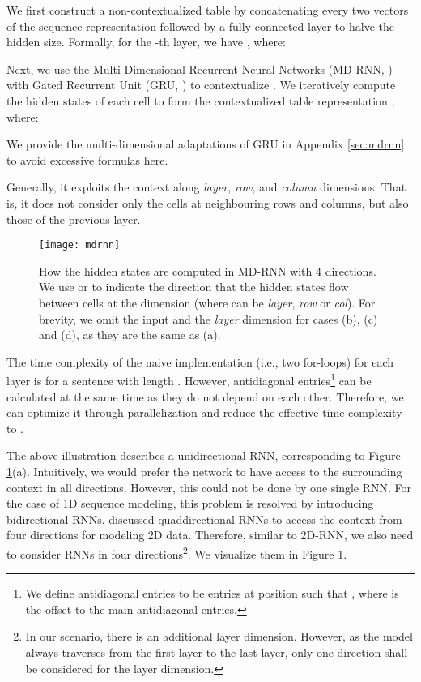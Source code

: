 \documentclass[11pt,a4paper]{article}
\begin{document}
We first construct a non-contextualized table  by concatenating every two vectors of the sequence representation followed by a fully-connected layer to halve the hidden size.
Formally, for the -th layer, we have , where:


Next, we use the Multi-Dimensional Recurrent Neural Networks (MD-RNN, \citealt{graves2007multi}) with Gated Recurrent Unit (GRU, \citealt{gru}) to contextualize .
We iteratively compute the hidden states of each cell to form the contextualized table representation , where:

We provide the multi-dimensional adaptations of GRU in Appendix \ref{sec:mdrnn} to avoid excessive formulas here.

Generally, it exploits the context along \emph{layer}, \emph{row}, and \emph{column} dimensions.
That is, it does not consider only the cells at neighbouring rows and columns,
but also those of the previous layer.

\begin{figure}
    \centering
    \texttt{[image: mdrnn]}
    \caption{How the hidden states are computed in MD-RNN with 4 directions.
    We use  or  to indicate the direction that the hidden states flow between cells at the  dimension (where  can be \emph{layer}, \emph{row} or \emph{col}).
    For brevity, we omit the input and the \emph{layer} dimension for cases (b), (c) and (d), as they are the same as (a).}
    \label{fig:mdrnn}
\end{figure}

{The time complexity of the naive implementation (i.e., two for-loops) for each layer is  for a sentence with length .
However, antidiagonal entries\footnote{
We define antidiagonal entries to be entries at position  such that ,
where  is the offset to the main antidiagonal entries.
} can be calculated at the same time as they do not depend on each other.
Therefore, we can optimize it through parallelization and reduce the effective time complexity to .}

The above illustration describes a unidirectional RNN, corresponding to Figure \ref{fig:mdrnn}(a).
Intuitively, we would prefer the network to have access to the surrounding context in all directions.
However, this could not be done by one single RNN.
For the case of 1D sequence modeling, this problem is resolved by introducing bidirectional RNNs.
\citet{graves2007multi} discussed quaddirectional RNNs to access the context from four directions for modeling 2D data.
Therefore, similar to 2D-RNN, we also need to consider RNNs in four directions\footnote{In our scenario, there is an additional layer dimension. However, as the model always traverses from the first layer to the last layer, only one direction shall be considered for the layer dimension.}.
We visualize them in Figure \ref{fig:mdrnn}.
\end{document}
